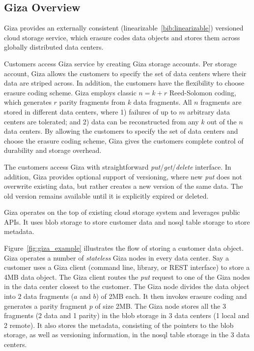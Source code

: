 
\subsection{Giza Overview}

Giza provides an externally consistent (linearizable~\ref{bib:linearizable}) versioned cloud storage service, which erasure codes data objects and stores them across globally distributed data centers.

Customers access Giza service by creating Giza storage accounts.
Per storage account, Giza allows the customers to specify the set of data centers where their data are striped across. In addition, the customers have the flexibility to choose erasure coding scheme. Giza employs classic $n = k + r$ Reed-Solomon coding, which generates $r$ parity fragments from $k$ data fragments. All $n$ fragments are stored in different data centers, where 1) failures of up to $m$ arbitrary data centers are tolerated; and 2) data can be reconstructed from any $k$ out of the $n$ data centers. By allowing the customers to specify the set of data centers and choose the erasure coding scheme, Giza gives the customers complete control of durability and storage overhead.

The customers access Giza with straightforward {\em put}/{\em get}/{\em delete} interface. In addition, Giza provides optional support of versioning, where new {\em put} does not overwrite existing data, but rather creates a new version of the same data. The old version remains available until it is explicitly expired or deleted.

Giza operates on the top of existing cloud storage system and leverages public APIs. It uses blob storage to store customer data and nosql table storage to store metadata.

Figure~\ref{fig:giza_example} illustrates the flow of storing a customer data object. Giza operates a number of {\em stateless} Giza nodes in every data center. Say a customer uses a Giza client (command line, library, or REST interface) to store a 4MB data object. The Giza client routes the {\em put} request to one of the Giza nodes in the data center closest to the customer. The Giza node divides the data object into $2$ data fragments ($a$ and $b$) of 2MB each. It then invokes erasure coding and generates a parity fragment $p$ of size 2MB. The Giza node stores all the $3$ fragments (2 data and 1 parity) in the blob storage in 3 data centers (1 local and 2 remote). It also stores the metadata, consisting of the pointers to the blob storage, as well as versioning information, in the nosql table storage in the 3 data centers.

